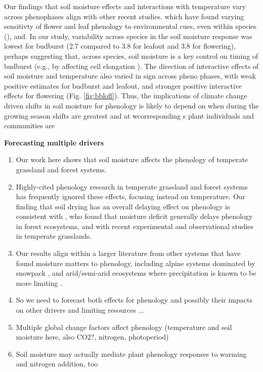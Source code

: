 \documentclass{article}
\begin{document}
\par Our findings that soil moisture effects and interactions with temperature vary across phenophases align with other recent studies. which have found varying sensitivty of flower and leaf phenology to environmental cues, even within species (), and.  In our study, variability across species in the soil moisture response was lowest for budburst (2.7 compared to 3.8 for leafout and  3.8 for flowering), perhaps suggesting that, across species, soil moisture is a key control on timing of budburst (e.g., by affecting cell elongation \citep{essiamah1986}). The direction of interactive effects of soil moisture and temperature also varied in sign across pheno phases, with weak positive estimates for budburst and leafout, and stronger positive interactive effects for flowering (Fig. \ref{fig:bblofl}). Thus, the implications of climate change driven shifts in soil moisture for phenology is likely to depend on when during the growing season shifts are greatest and at wcorresponding s plant individuals and communities are 


\textbf {Forecasting multiple drivers }
\begin{enumerate}
\item Our work here shows that soil moisture affects the phenology of temperate grassland and forest systems.
\item Highly-cited phenology research in temperate grassland and forest systems has frequently ignored these effects, focusing instead on temperature. Our finding that soil drying has an overall delaying effect on phenology is consistent with \citet{seyed2018}, who found that moisture deficit generally delays phenology in forest ecosystems, and with recent experimental \citep{liu2022} and observational \citep{tao2020} studies in temperate grasslands. 
\item Our results align within a larger literature from other systems that have found moisture matters to phenology, including alpine systems dominated by snowpack \citep[e.g.,][]{dunne2004,sherwood2017}, and arid/semi-arid ecosystems where precipitation is known to be more limiting \citep{tao2019}. 
\item So we need to forecast both effects for phenology and possibly their impacts on other drivers and limiting resources ... 
\item Multiple global change factors affect phenology (temperature and soil moisture here, also CO2?, nitrogen, photoperiod)
 \item Soil moisture may actually mediate plant phenology responses to warming and nitrogen addition, too \citep{liu2022}
 \end{enumerate}
\end{document}
